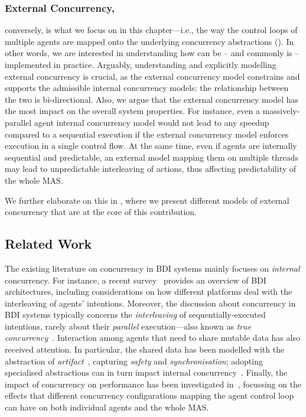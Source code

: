 \subsubsection{External Concurrency,} conversely, is what we focus on in this chapter---i.e., the way the control loops of multiple agents are mapped onto the underlying concurrency abstractions
().
%
In other words, we are interested in understanding how  can be -- and commonly is -- implemented in practice.
%
Arguably,
understanding and explicitly modelling external concurrency is crucial,
as the external concurrency model constrains and supports the admissible internal concurrency models:
the relationship between the two is bi-directional.
%
Also,
we argue that the external concurrency model has the most impact on the overall system properties.
%
For instance,
even a massively-parallel agent internal concurrency model would not lead to any speedup 
compared to a sequential execution
if the external concurrency model enforces execution in a single control flow.
%
At the same time, even if agents are internally sequential and predictable,
an external model mapping them on multiple threads may lead to unpredictable interleaving of actions, 
thus affecting predictability of the whole MAS.

We further elaborate on this in , 
where we present different models of external concurrency that are at the core of this contribution.


\subsection{Related Work}\label{sec:related_agent_concurrency}

The existing literature on concurrency in \ac{BDI} systems mainly focuses on
\emph{internal} concurrency.
%
For instance,
a recent survey~\cite{SilvaML20} provides an overview of \ac{BDI} architectures,
including considerations on how different platforms deal with the interleaving of agents' intentions.
%
Moreover,
the discussion about concurrency in \ac{BDI} systems 
typically concerns the \emph{interleaving} of sequentially-executed intentions,
rarely about their \emph{parallel} execution---also known as \emph{true concurrency}~\cite{Silva2020AnOS}.
%
Interaction among agents that need to share mutable data has also received attention.
%
In particular,
the shared data has been modelled with the abstraction of \emph{artifact}~\cite{ricci13-akifest},
capturing \emph{safety} and \emph{synchronisation};
adopting specialised abstractions can in turn impact internal concurrency~\cite{aloo-agere2013}.
%
Finally, the impact of concurrency on performance has been investigated in~\cite{ZatelliRH2015},
focussing on the effects that different concurrency configurations mapping the agent control loop can have on both  individual agents and the whole MAS.

